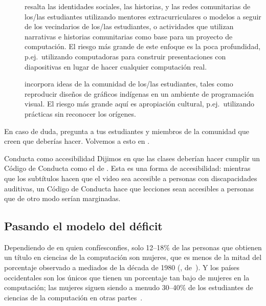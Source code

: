 \begin{description}

\item[{}]
  resalta las identidades sociales, las historias, y las redes comunitarias de los/las estudiantes
  utilizando mentores extracurriculares o modelos a seguir de los vecindarios de los/las estudiantes,
  o actividades que utilizan narrativas e historias comunitarias
  como base para un proyecto de computación.
  El riesgo más grande de este enfoque es la poca profundidad,
  p.ej.\ utilizando computadoras para construir presentaciones con diapositivas en lugar de hacer cualquier computación real.

\item[{}]
  incorpora ideas de la comunidad de los/las estudiantes,
  tales como reproducir diseños de gráficos indígenas en un ambiente de programación visual.
  El riesgo más grande aquí es apropiación cultural,
  p.ej.\ utilizando prácticas sin reconocer los orígenes.

\end{description}

En caso de duda,
pregunta a tus estudiantes y miembros de la comunidad que creen que deberías hacer.
Volvemos a esto en .

\begin{aside}{Conducta como accesibilidad}
  Dijimos en  que las clases deberían hacer cumplir un Código de Conducta como el de .
  Esta es una forma de accesibilidad:
  mientras que los subtítulos hacen que el video sea accesible a personas con discapacidades auditivas,
  un Código de Conducta hace que lecciones sean accesibles a personas que de otro modo serían marginadas.
\end{aside}

\subsection*{Pasando el modelo del déficit}

Dependiendo de en quien confíesconfies,
solo 12--18\% de las personas que obtienen un título en ciencias de la computación son mujeres,
que es menos de la mitad del porcentaje observado a mediados de la década de 1980
(, de~\cite{Robe2017}).
Y los países occidentales son los únicos que tienen un porcentaje tan bajo de mujeres en la computación;
las mujeres siguen siendo a menudo 30--40\% de los estudiantes de ciencias de la computación en otras partes~\cite{Galp2002,Varm2015}.

